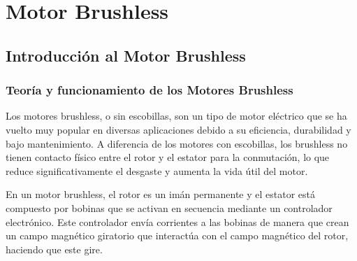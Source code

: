 \documentclass[../main]{subfiles}
\begin{document}
\setcounter{chapter}{5}
\chapter{Motor Brushless}
\section{Introducción al Motor Brushless}

\subsection{Teoría y funcionamiento de los Motores Brushless}

Los motores brushless, o sin escobillas, son un tipo de motor eléctrico que se ha vuelto muy popular en diversas aplicaciones debido a su eficiencia, durabilidad y bajo mantenimiento. A diferencia de los motores con escobillas, los brushless no tienen contacto físico entre el rotor y el estator para la conmutación, lo que reduce significativamente el desgaste y aumenta la vida útil del motor.


En un motor brushless, el rotor es un imán permanente y el estator está compuesto por bobinas que se activan en secuencia mediante un controlador electrónico. Este controlador envía corrientes a las bobinas de manera que crean un campo magnético giratorio que interactúa con el campo magnético del rotor, haciendo que este gire.
\end{document}
